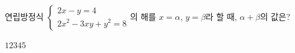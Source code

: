 연립방정식 $\begin{cases} 2x-y=4 \\ 2x^2-3xy+y^2=8 \end{cases}$의 해를 $x=\alpha$, $y=\beta$라 할 때, $\alpha+\beta$의 값은?
\begin{choices32}{$1$}{$2$}{$3$}{$4$}{$5$}\end{choices32}
